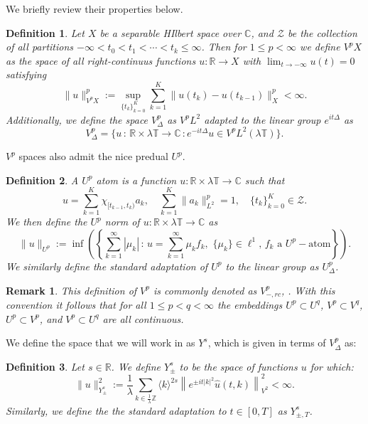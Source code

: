 \documentclass[12pt, letterpaper]{amsart}
\newtheorem{remark}{Remark}
\newtheorem{definition}{Definition}
\begin{document}
We briefly review their properties below.
\begin{definition}
    Let $X$ be a separable HIlbert space over $\mathbb{C}$, and $\mathcal{Z}$ be the collection of all partitions $-\infty < t_0 < t_1 < \cdots < t_k\leq \infty$. Then for $1\leq p < \infty$ we define $V^pX$ as the space of all right-continuus functions $u:\mathbb{R}\to X$ with $\lim_{t\to-\infty} u(t) = 0$ satisfying
    \[
\|u\|_{V^pX}^p := \sup_{\{t_k\}_{k=0}^K}\sum_{k=1}^K\|u(t_k)-u(t_{k-1})\|_{X}^p < \infty.
    \]
    Additionally, we define the space $V^p_{\Delta}$ as $V^pL^2$ adapted to the linear group $e^{it\Delta}$ as
    \[
    V^p_{\Delta} = \{u\,:\,\mathbb{R}\times \lambda\mathbb{T}\to \mathbb{C}\,:e^{-it\Delta}u\in V^pL^2(\lambda\mathbb{T})\}.
    \]
\end{definition}
$V^p$ spaces also admit the nice predual $U^p$. 
\begin{definition}
    A $U^p$ atom is a function $u:\mathbb{R}\times\lambda\mathbb{T}\to \mathbb{C}$ such that
    \[
u = \sum_{k=1}^K\chi_{[t_{k-1},t_k)}a_k,\quad \sum_{k=1}^K\|a_k\|_{L^2}^p = 1,\quad\{t_k\}_{k=0}^K\in\mathcal{Z}.
    \]
    We then define the $U^p$ norm of $u:\mathbb{R}\times\lambda \mathbb{T}\to \mathbb{C}$ as
    \[
\|u\|_{U^p} := \inf\left(\left\{\sum_{k=1}^\infty |\mu_k|\,:\,u = \sum_{k=1}^\infty \mu_k f_k,\,\,\{\mu_k\}\in\ell^1,\,f_k\mbox{ a }U^p-\mbox{atom}\right\}\right).
    \]
    We similarly define the standard adaptation of $U^p$ to the linear group as $U^p_\Delta$.
\end{definition}
\begin{remark}\label{Remark: Embeddings}
    This definition of $V^p$ is commonly denoted as $V^p_{-,rc}$, \cite{MR2526409}. With this convention it follows that for all $1\leq p<q<\infty$ the embeddings $U^p\subset U^q$, $V^p\subset V^q$, $U^p\subset V^p$, and $V^p\subset U^q$ are all continuous.
\end{remark}

We define the space that we will work in as $Y^s$, which is given in terms of $V^p_\Delta$ as:
\begin{definition}
    Let $s\in\mathbb{R}$. We define $Y^s_{\pm}$ to be the space of functions $u$ for which:
    \[
\|u\|_{Y^s_{\pm}}^2 := \frac{1}{\lambda}\sum_{k\in\frac{1}{\lambda}\mathbb{Z}}\langle k\rangle^{2s}\left\|e^{\pm it|k|^2}\widehat{u}(t,k)\right\|_{V^2}^2 < \infty.
    \]
    Similarly, we define the the standard adaptation to $t\in[0,T]$ as $Y^s_{\pm,T}$.
\end{definition}
\end{document}
